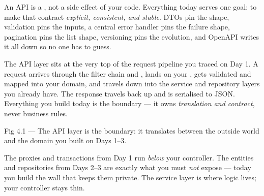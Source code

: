 \begin{keyidea}
An API is a , not a side effect of your code. Everything today serves one goal: to make that contract \emph{explicit, consistent, and stable}. DTOs pin the shape, validation pins the inputs, a central error handler pins the failure shape, pagination pins the list shape, versioning pins the evolution, and OpenAPI writes it all down so no one has to guess.
\end{keyidea}

 The API layer sits at the very top of the request pipeline you traced on Day 1. A request arrives through the filter chain and , lands on your , gets validated and mapped into your domain, and travels down into the service and repository layers you already have. The response travels back up and is serialised to JSON. Everything you build today is the boundary --- it owns \emph{translation and contract}, never business rules.

\begin{wbfigure}{Fig 4.1 --- The API layer is the boundary: it translates between the outside world and the domain you built on Days 1--3.}
\end{wbfigure}

 The proxies and transactions from Day 1 run \emph{below} your controller. The entities and repositories from Days 2--3 are exactly what you must \emph{not} expose --- today you build the wall that keeps them private. The service layer is where logic lives; your controller stays thin.

